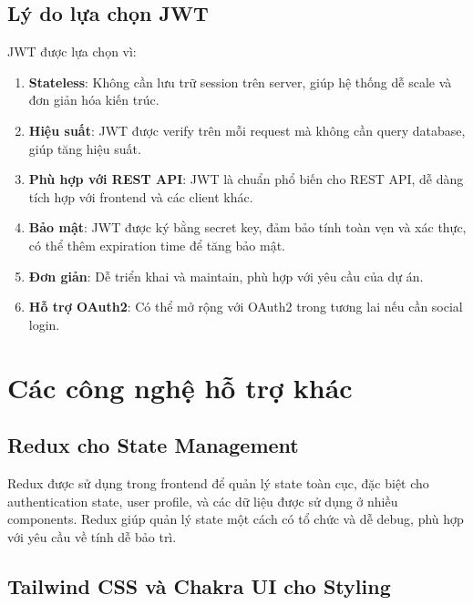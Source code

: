\documentclass[../DoAn.tex]{subfiles}
\begin{document}
\subsection{Lý do lựa chọn JWT}

JWT được lựa chọn vì:

\begin{enumerate}
    \item \textbf{Stateless}: Không cần lưu trữ session trên server, giúp hệ thống dễ scale và đơn giản hóa kiến trúc.
    
    \item \textbf{Hiệu suất}: JWT được verify trên mỗi request mà không cần query database, giúp tăng hiệu suất.
    
    \item \textbf{Phù hợp với REST API}: JWT là chuẩn phổ biến cho REST API, dễ dàng tích hợp với frontend và các client khác.
    
    \item \textbf{Bảo mật}: JWT được ký bằng secret key, đảm bảo tính toàn vẹn và xác thực, có thể thêm expiration time để tăng bảo mật.
    
    \item \textbf{Đơn giản}: Dễ triển khai và maintain, phù hợp với yêu cầu của dự án.
    
    \item \textbf{Hỗ trợ OAuth2}: Có thể mở rộng với OAuth2 trong tương lai nếu cần social login.
\end{enumerate}

\section{Các công nghệ hỗ trợ khác}
\label{section:3.7}

\subsection{Redux cho State Management}

Redux được sử dụng trong frontend để quản lý state toàn cục, đặc biệt cho authentication state, user profile, và các dữ liệu được sử dụng ở nhiều components. Redux giúp quản lý state một cách có tổ chức và dễ debug, phù hợp với yêu cầu về tính dễ bảo trì.

\subsection{Tailwind CSS và Chakra UI cho Styling}
\end{document}
